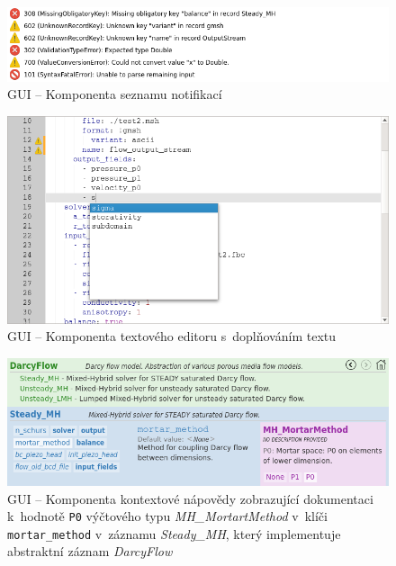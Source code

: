 \documentclass[FM,bw,DP]{tulthesis}
\begin{document}
\begin{figure}[h]
	\centering
    \includegraphics[width=\textwidth]{../img/screenshots/gui_notifications.png}
    \caption{GUI -- Komponenta seznamu notifikací}
	\label{img:gui_notifications}
\end{figure}

\begin{figure}[H]
	\centering
    \includegraphics[width=\textwidth]{../img/screenshots/gui_editor_autocompletion.png}
    \caption{GUI -- Komponenta textového editoru s~doplňováním textu}
	\label{img:gui_editor_autocompletion}
\end{figure}

\clearpage

\begin{figure}[h!]
	\centering
    \includegraphics[width=\textwidth]{../img/screenshots/gui_doc_mortar_method.png}
    \caption[GUI -- Kontextová nápověda pro záznam \textit{Steady\_MH}]{GUI -- Komponenta kontextové nápovědy zobrazující dokumentaci k~hodnotě \texttt{P0} výčtového typu \textit{MH\_MortartMethod} v~klíči \texttt{mortar\_method} v~záznamu \textit{Steady\_MH}, který implementuje abstraktní záznam \textit{DarcyFlow}}
	\label{img:gui_doc_mortar_method}
\end{figure}
\end{document}
